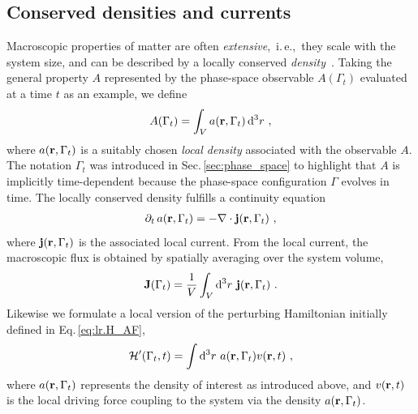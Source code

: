 \subsection{Conserved densities and currents}
Macroscopic properties of matter are often \emph{extensive},~i.\,e.,~they scale with the system size, and can be described by a locally conserved \emph{density}~\cite{Baroni2020a}. Taking the general property $A$ represented by the phase-space observable $A(\Gamma_t)$ evaluated at a time $t$ as an example, we define
\begin{align}
  A (\Gamma_t) = \int_V a (\b r, \Gamma_t) \, \d^3 r~,
  \label{eq:lr.A}
\end{align}
where $a({\bf r}, \Gamma_t)$ is a suitably chosen \emph{local density} associated with the observable $A$. The notation $\Gamma_t$ was introduced in Sec.\,\ref{sec:phase_space} to highlight that $A$ is implicitly time-dependent because the phase-space configuration $\Gamma$ evolves in time.
The locally conserved density fulfills a continuity equation
\begin{align}
  \partial_t \, a(\b r, \Gamma_t) = - \b \nabla \cdot \b j (\b r, \Gamma_t)~,
  \label{eq:lr.continuity.1}
\end{align}
where ${\bf j} ({\bf r}, \Gamma_t)$ is the associated local current. From the local current, the macroscopic flux is obtained by spatially averaging over the system volume,
\begin{align}
  \b J (\Gamma_t)
    = \frac{1}{V} \int_V \d^3 r ~ \b j (\b r, \Gamma_t)~.
  \label{eq:lr.J(t)}
\end{align}
Likewise we formulate a local version of the perturbing Hamiltonian initially defined in Eq.\,\eqref{eq:lr.H_AF},
\begin{align}
	\mathcal H' (\Gamma_t, t) = \int \d^3 r ~ a (\b r, \Gamma_t) v(\b r, t)~,
	\label{eq:lr.H'}
\end{align}
where $a({\bf r}, \Gamma_t)$ represents the density of interest as introduced above, and $v({\bf r}, t)$ is the local driving force coupling to the system via the density $a ({\bf r}, \Gamma_t)$.

